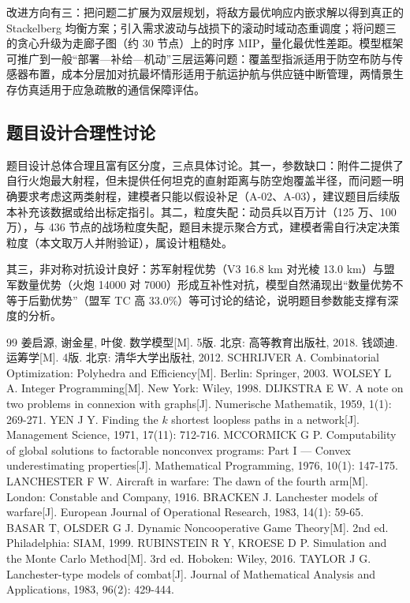 \documentclass[12pt,a4paper]{ctexart}
\begin{document}
改进方向有三：把问题二扩展为双层规划，将敌方最优响应内嵌求解以得到真正的 Stackelberg 均衡方案；引入需求波动与战损下的滚动时域动态重调度；将问题三的贪心升级为走廊子图（约 30 节点）上的时序 MIP，量化最优性差距。模型框架可推广到一般“部署—补给—机动”三层运筹问题：覆盖型指派适用于防空布防与传感器布置，成本分层加对抗最坏情形适用于航运护航与供应链中断管理，两情景生存仿真适用于应急疏散的通信保障评估。

\subsection{题目设计合理性讨论}

题目设计总体合理且富有区分度，三点具体讨论。其一，参数缺口：附件二提供了自行火炮最大射程，但未提供任何坦克的直射距离与防空炮覆盖半径，而问题一明确要求考虑这两类射程，建模者只能以假设补足（A-02、A-03），建议题目后续版本补充该数据或给出标定指引。其二，粒度失配：动员兵以百万计（125 万、100 万），与 436 节点的战场粒度失配，题目未提示聚合方式，建模者需自行决定决策粒度（本文取万人并附验证），属设计粗糙处。

其三，非对称对抗设计良好：苏军射程优势（V3 16.8 km 对光棱 13.0 km）与盟军数量优势（火炮 14000 对 7000）形成互补性对抗，模型自然涌现出“数量优势不等于后勤优势”（盟军 TC 高 33.0\%）等可讨论的结论，说明题目参数能支撑有深度的分析。

\newpage
\begin{thebibliography}{99}
 姜启源, 谢金星, 叶俊. 数学模型[M]. 5版. 北京: 高等教育出版社, 2018.
 钱颂迪. 运筹学[M]. 4版. 北京: 清华大学出版社, 2012.
 SCHRIJVER A. Combinatorial Optimization: Polyhedra and Efficiency[M]. Berlin: Springer, 2003.
 WOLSEY L A. Integer Programming[M]. New York: Wiley, 1998.
 DIJKSTRA E W. A note on two problems in connexion with graphs[J]. Numerische Mathematik, 1959, 1(1): 269-271.
 YEN J Y. Finding the $k$ shortest loopless paths in a network[J]. Management Science, 1971, 17(11): 712-716.
 MCCORMICK G P. Computability of global solutions to factorable nonconvex programs: Part I — Convex underestimating properties[J]. Mathematical Programming, 1976, 10(1): 147-175.
 LANCHESTER F W. Aircraft in warfare: The dawn of the fourth arm[M]. London: Constable and Company, 1916.
 BRACKEN J. Lanchester models of warfare[J]. European Journal of Operational Research, 1983, 14(1): 59-65.
 BASAR T, OLSDER G J. Dynamic Noncooperative Game Theory[M]. 2nd ed. Philadelphia: SIAM, 1999.
 RUBINSTEIN R Y, KROESE D P. Simulation and the Monte Carlo Method[M]. 3rd ed. Hoboken: Wiley, 2016.
 TAYLOR J G. Lanchester-type models of combat[J]. Journal of Mathematical Analysis and Applications, 1983, 96(2): 429-444.
\end{thebibliography}
\end{document}
